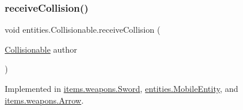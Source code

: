 \mbox{\label{interfaceentities_1_1_collisionable_a956a85182fef376af333622e844342e3}} 
\subsubsection{\texorpdfstring{receive\+Collision()}{receiveCollision()}}
{\footnotesize\ttfamily void entities.\+Collisionable.\+receive\+Collision (\begin{DoxyParamCaption}\item[{\mbox{\hyperlink{interfaceentities_1_1_collisionable}{Collisionable}}}]{author }\end{DoxyParamCaption})}



Implemented in \mbox{\hyperlink{classitems_1_1weapons_1_1_sword_acf006a33d1194218cc4e3fa2474a401e}{items.\+weapons.\+Sword}}, \mbox{\hyperlink{classentities_1_1_mobile_entity_a84c8b17b0285f2ed67edadb70e1db80b}{entities.\+Mobile\+Entity}}, and \mbox{\hyperlink{classitems_1_1weapons_1_1_arrow_ae73288a331d5f87316ddf1f6e7d113ca}{items.\+weapons.\+Arrow}}.

